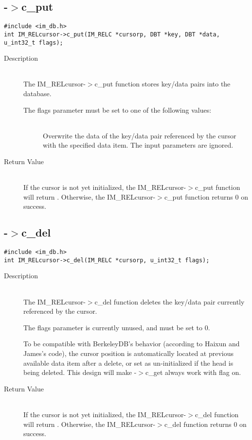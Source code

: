 \newpage
\subsection{{\IMRELcursor}-$>$c\_put}
\begin{verbatim}
#include <im_db.h>
int IM_RELcursor->c_put(IM_RELC *cursorp, DBT *key, DBT *data, u_int32_t flags);
\end{verbatim}
\begin{description}
\item[Description]\ \\

  The IM\_RELcursor-$>$c\_put function stores key/data pairs into the
  database.

  The flags parameter must be set to one of the following values: 
  \begin{description}
  \item[{\DBCURRENT}]\ \\
    Overwrite the data of the key/data pair referenced by the cursor
    with the specified data item. The input parameters are ignored. 
  \end{description}

\item[Return Value]\ \\
  If the cursor is not yet initialized, the IM\_RELcursor-$>$c\_put
  function will return {\DBNOTFOUND}. Otherwise, the
  IM\_RELcursor-$>$c\_put function returns 0 on success. 
\end{description}

\newpage
\subsection{{\IMRELcursor}-$>$c\_del}
\begin{verbatim}
#include <im_db.h>
int IM_RELcursor->c_del(IM_RELC *cursorp, u_int32_t flags);
\end{verbatim}
\begin{description}
\item[Description]\ \\

  The IM\_RELcursor-$>$c\_del function deletes the key/data pair currently
  referenced by the cursor. 

  The flags parameter is currently unused, and must be set to 0. 

  To be compatible with BerkeleyDB's behavior (according to Haixun and
  James's code),  the cursor position is automatically located at
  previous available data item after a delete, or set as
  un-initialized if the head is being deleted.  This design will make
  {\IMRELcursor}-$>$c\_get always work with {\DBNEXT} flag on.

\item[Return Value]\ \\
  If the cursor is not yet initialized, the IM\_RELcursor-$>$c\_del
  function will return {\DBNOTFOUND}. Otherwise, the
  IM\_RELcursor-$>$c\_del function returns 0 on success. 
\end{description}

